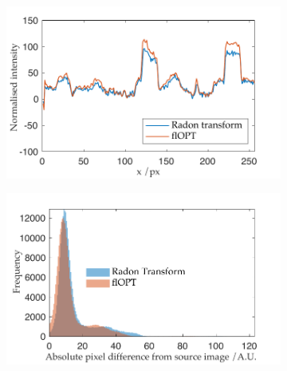 \documentclass{osa-article}
\begin{document}
\begin{figure}
  \centering
  \begin{subfigure}[t]{0.45\linewidth}
    \centering
    \includegraphics[width=\linewidth]{./figures/results/comparison_line_profile}
    \caption{}\label{fig:flopt_comparison_line_profile}
  \end{subfigure}\quad
 \begin{subfigure}[t]{0.45\linewidth}
    \centering
    \includegraphics[width=\linewidth]{./figures/results/flopt_histogram}

\end{subfigure}
\end{figure}
\end{document}
